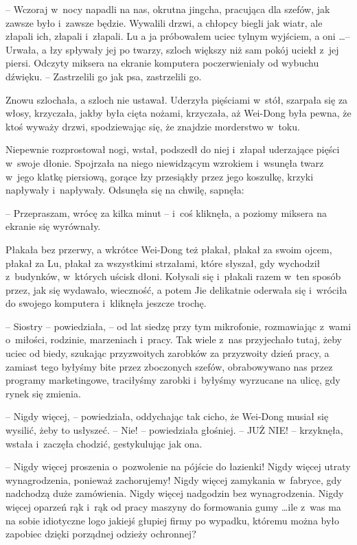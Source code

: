 \documentclass[oneside,polish,11pt,rmheadings]{mwbk}
\begin{document}
-- Wczoraj w~nocy napadli na nas, okrutna jingcha, pracująca dla szefów, jak zawsze było i~zawsze będzie. Wywalili drzwi, a chłopcy biegli jak wiatr, ale złapali ich, złapali i~złapali. Lu a ja próbowałem uciec tylnym wyjściem, a oni \ldots  -- Urwała, a łzy spływały jej po twarzy, szloch większy niż sam pokój uciekł z~jej piersi. Odczyty miksera na ekranie komputera poczerwieniały od wybuchu dźwięku. -- Zastrzelili go jak psa, zastrzelili go.

Znowu szlochała, a szloch nie ustawał. Uderzyła pięściami w~stół, szarpała się za włosy, krzyczała, jakby była cięta nożami, krzyczała, aż Wei-Dong była pewna, że ktoś wyważy drzwi, spodziewając się, że znajdzie morderstwo w~toku.

Niepewnie rozprostował nogi, wstał, podszedł do niej i~złapał uderzające pięści w~swoje dłonie. Spojrzała na niego niewidzącym wzrokiem i~wsunęła twarz w~jego klatkę piersiową, gorące łzy przesiąkły przez jego koszulkę, krzyki napływały i~napływały. Odsunęła się na chwilę, sapnęła: 

-- Przepraszam, wrócę za kilka minut -- i~coś kliknęła, a poziomy miksera na ekranie się wyrównały.

Płakała bez przerwy, a wkrótce Wei-Dong też płakał, płakał za swoim ojcem, płakał za Lu, płakał za wszystkimi strzałami, które słyszał, gdy wychodził z~budynków, w~których uścisk dłoni. Kołysali się i~płakali razem w~ten sposób przez, jak się wydawało, wieczność, a potem Jie delikatnie oderwała się i~wróciła do swojego komputera i~kliknęła jeszcze trochę.

-- Siostry -- powiedziała, -- od lat siedzę przy tym mikrofonie, rozmawiając z~wami o~miłości, rodzinie, marzeniach i~pracy. Tak wiele z~nas przyjechało tutaj, żeby uciec od biedy, szukając przyzwoitych zarobków za przyzwoity dzień pracy, a zamiast tego byłyśmy bite przez zboczonych szefów, obrabowywano nas przez programy marketingowe, traciłyśmy zarobki i~byłyśmy wyrzucane na ulicę, gdy rynek się zmienia.

-- Nigdy więcej, -- powiedziała, oddychając tak cicho, że Wei-Dong musiał się wysilić, żeby to usłyszeć. -- Nie! -- powiedziała głośniej. -- JUŻ NIE! -- krzyknęła, wstała i~zaczęła chodzić, gestykulując jak ona.

-- Nigdy więcej proszenia o~pozwolenie na pójście do łazienki! Nigdy więcej utraty wynagrodzenia, ponieważ zachorujemy! Nigdy więcej zamykania w~fabryce, gdy nadchodzą duże zamówienia. Nigdy więcej nadgodzin bez wynagrodzenia. Nigdy więcej oparzeń rąk i~rąk od pracy maszyny do formowania gumy  \ldots  ile z~was ma na sobie idiotyczne logo jakiejś głupiej firmy po wypadku, któremu można było zapobiec dzięki porządnej odzieży ochronnej?
\end{document}
